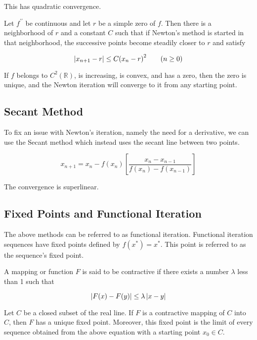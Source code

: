         This has quadratic convergence.

        \begin{thm}
            Let $f^{\prime\prime}$ be continuous and let $r$ be a simple zero of $f$. Then there is a neighborhood of
            $r$ and a constant $C$ such that if Newton's method is started in that neighborhood, the successive points
            become steadily closer to $r$ and satisfy

            \[
                \left\lvert x_{n + 1} - r \right\rvert \le C {(x_n - r)}^2 \qquad (n \ge 0)
            \]
        \end{thm}

        \begin{thm}
            If $f$ belongs to $C^2(\mathbb{R})$, is increasing, is convex, and has a zero, then the zero is unique, and
            the Newton iteration will converge to it from any starting point.
        \end{thm}

    \subsection{Secant Method}
        To fix an issue with Newton's iteration, namely the need for a derivative, we can use the Secant method which
        instead uses the secant line between two points.

        \[ x_{n + 1} = x_n - f(x_n) \left[ \frac{x_n - x_{n - 1}}{f(x_n) - f(x_{n - 1})} \right] \]

        The convergence is superlinear.

    \subsection{Fixed Points and Functional Iteration}
    The above methods can be referred to as functional iteration. Functional iteration sequences have fixed points
    defined by $f(x^*) = x^*$. This point is referred to as the sequence's fixed point.

    A mapping or function $F$ is said to be contractive if there exists a number $\lambda$ less than 1 such that

    \[ \left\lvert F(x) - F(y) \right\rvert \le \lambda \left\lvert x - y \right\rvert \]

    \begin{thm}
        Let $C$ be a closed subset of the real line. If $F$ is a contractive mapping of $C$ into $C$, then $F$ has a
        unique fixed point. Moreover, this fixed point is the limit of every sequence obtained from the above equation
        with a starting point $x_0 \in C$.
    \end{thm}

